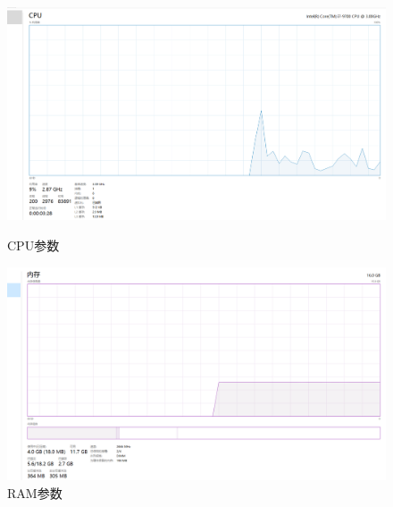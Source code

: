 \begin{figure}[htbp]
	\centering
	\begin{minipage}[t]{0.48\textwidth}
		\centering
		\includegraphics[width=1\textwidth]{figures/device_para/cpu.png}
		\caption{CPU参数}
		\label{fig:cpupara}
	\end{minipage}
	\begin{minipage}[t]{0.48\textwidth}
		\centering
		\includegraphics[width=1\textwidth]{figures/device_para/ram.png}
		\caption{RAM参数}
		\label{fig:rampara}
	\end{minipage}


\end{figure}
